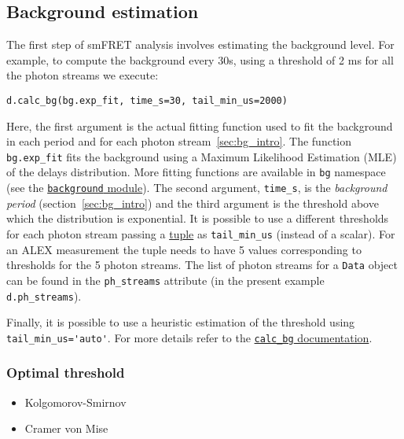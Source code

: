 \subsection{Background estimation}
\label{sec:bg_calc}

The first step of smFRET analysis involves estimating the background level. For example, to compute the background every 30s, using a threshold of 2 ms for all the photon streams we execute: 

\begin{verbatim}
d.calc_bg(bg.exp_fit, time_s=30, tail_min_us=2000)
\end{verbatim}

Here, the first argument is the actual fitting function used to fit the
background in each period and for each photon stream~\ref{sec:bg_intro}. The function 
\verb|bg.exp_fit| fits the background using a Maximum Likelihood Estimation 
(MLE) of the delays distribution. More fitting functions are available in 
\verb|bg| namespace (see the 
\href{http://fretbursts.readthedocs.org/en/latest/background.html}
{\texttt{background} module}). The second argument, \verb|time_s|, is the 
\textit{background period} (section~\ref{sec:bg_intro}) and the third argument is the threshold above which the distribution is exponential. 
It is possible to use a different thresholds 
for each photon stream passing a \href{https://docs.python.org/2/tutorial/datastructures.html#tuples-and-sequences}{tuple} as \verb|tail_min_us| (instead 
of a scalar). For an ALEX measurement the tuple needs to have 5 values 
corresponding to thresholds for the 5 photon streams. The list of photon 
streams for a \verb|Data| object can be found in the \verb|ph_streams| 
attribute (in the present example \verb|d.ph_streams|). 

Finally, it is 
possible to use a heuristic estimation of the threshold using 
\verb|tail_min_us='auto'|. For more details refer to the 
\href{http://fretbursts.readthedocs.org/en/latest/data_class.html#fretbursts.burstlib.Data.calc_bg}{\texttt{calc\_bg} documentation}.

\subsubsection{Optimal threshold}
\begin{itemize}
\item Kolgomorov-Smirnov
\item Cramer von Mise
\end{itemize}
